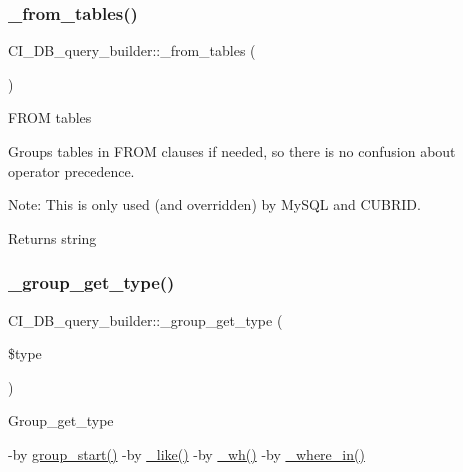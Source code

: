 \subsubsection{\texorpdfstring{\+\_\+from\+\_\+tables()}{\_from\_tables()}}
{\footnotesize\ttfamily C\+I\+\_\+\+D\+B\+\_\+query\+\_\+builder\+::\+\_\+from\+\_\+tables (\begin{DoxyParamCaption}{ }\end{DoxyParamCaption})\hspace{0.3cm}{\ttfamily [protected]}}

F\+R\+OM tables

Groups tables in F\+R\+OM clauses if needed, so there is no confusion about operator precedence.

Note\+: This is only used (and overridden) by My\+S\+QL and C\+U\+B\+R\+ID.

\begin{DoxyReturn}{Returns}
string 
\end{DoxyReturn}
\mbox{\label{class_c_i___d_b__query__builder_ab36c60f24fc92789c616e9f58ba3627f}} 
\subsubsection{\texorpdfstring{\+\_\+group\+\_\+get\+\_\+type()}{\_group\_get\_type()}}
{\footnotesize\ttfamily C\+I\+\_\+\+D\+B\+\_\+query\+\_\+builder\+::\+\_\+group\+\_\+get\+\_\+type (\begin{DoxyParamCaption}\item[{}]{\$type }\end{DoxyParamCaption})\hspace{0.3cm}{\ttfamily [protected]}}

Group\+\_\+get\+\_\+type

-\/by \mbox{\hyperlink{class_c_i___d_b__query__builder_aace0c009f52375adf5dffe6596330272}{group\+\_\+start()}} -\/by \mbox{\hyperlink{class_c_i___d_b__query__builder_aa084a245f6732555abd55b00ab73713a}{\+\_\+like()}} -\/by \mbox{\hyperlink{class_c_i___d_b__query__builder_ae7da7cfc4e206d9f962326ed3e0a55a5}{\+\_\+wh()}} -\/by \mbox{\hyperlink{class_c_i___d_b__query__builder_ac5d927ea77115642098054d4804e342c}{\+\_\+where\+\_\+in()}}


